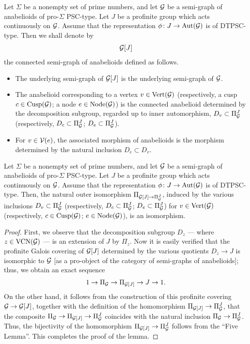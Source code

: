 \begin{defn}
  Let $\Sigma$ be a nonempty set of prime numbers, and let $\mathcal{G}$ be a semi-graph of anabelioids of pro-$\Sigma$ PSC-type. Let $J$ be a profinite group which acts continuously on $\mathcal{G}$. Assume that the representation $\phi \colon J \to \mathrm{Aut}(\mathcal{G})$ is of DTPSC-type. Then we shall denote by \[\mathcal{G}[J]\] the connected semi-graph of anabelioids defined as follows.
  \begin{itemize}
    \item The underlying semi-graph of $\mathcal{G}[J]$ is the underlying semi-graph of $\mathcal{G}$.
    \item The anabelioid corresponding to a vertex $v \in \mathrm{Vert}(\mathcal{G})$ (respectively, a cusp $c \in \mathrm{Cusp}(\mathcal{G})$; a node $e \in \mathrm{Node}(\mathcal{G})$) is the connected anabelioid determined by the decomposition subgroup, regarded up to inner automorphism, $D_v \subset \Pi_{\mathcal{G}}^J$ (respectively, $D_c \subset \Pi_{\mathcal{G}}^J$; $D_e \subset \Pi_{\mathcal{G}}^J$).
    \item For $v \in \mathcal{V}(e)$, the associated morphism of anabelioids is the morphism determined by the natural inclusion $D_e \subset D_v$.
  \end{itemize}
\end{defn}

\begin{lem}
  Let $\Sigma$ be a nonempty set of prime numbers, and let $\mathcal{G}$ be a semi-graph of anabelioids of pro-$\Sigma$ PSC-type. Let $J$ be a profinite group which acts continuously on $\mathcal{G}$. Assume that the representation $\phi \colon J \to \mathrm{Aut}(\mathcal{G})$ is of DTPSC-type. Then, the natural outer isomorphism $\Pi_{\mathcal{G}[J] \to \Pi_{\mathcal{G}}^J}$, induced by the various inclusions $D_v \subset \Pi_{\mathcal{G}}^J$ (respectively, $D_c \subset \Pi_{\mathcal{G}}^J$; $D_e \subset \Pi_{\mathcal{G}}^J$) for $v \in \mathrm{Vert}(\mathcal{G})$ (respectively, $c \in \mathrm{Cusp}(\mathcal{G})$; $e \in \mathrm{Node}(\mathcal{G})$), is an isomorphism.
\end{lem}
\begin{proof}
  First, we observe that the decomposition subgroup $D_z$ --- where $z \in \mathrm{VCN}(\mathcal{G})$ --- is an extension of $J$ by $\Pi_z$. Now it is easily verified that the profinite Galois covering of $\mathcal{G}[J]$ determined by the various quotients $D_z \to J$ is isomorphic to $\mathcal{G}$ [as a pro-object of the category of semi-graphs of anabelioids]; thus, we obtain an exact sequence
  \[
    1 \to \Pi_{\mathcal{G}} \to \Pi_{\mathcal{G}[J]} \to J \to 1.
  \]
  On the other hand, it follows from the construction of this profinite covering $\mathcal{G} \to \mathcal{G}[J]$, together with the definition of the homomorphism $\Pi_{\mathcal{G}[J]} \to \Pi_{\mathcal{G}}^J$, that the composite $\Pi_{\mathcal{G}} \to \Pi_{\mathcal{G}[J]} \to \Pi_{\mathcal{G}}^J$ coincides with the natural inclusion $\Pi_{\mathcal{G}} \to \Pi_{\mathcal{G}}^J$. Thus, the bijectivity of the homomorphism $\Pi_{\mathcal{G}[J]} \to \Pi_{\mathcal{G}}^J$ follows from the ``Five Lemma''. This completes the proof of the lemma.
\end{proof}

